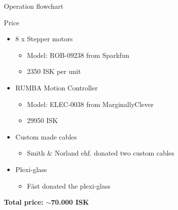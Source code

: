 \documentclass{rubeamer}
\begin{document}
\begin{frame}{Operation flowchart}
	\begin{center}
	\end{center}
\end{frame}

\begin{frame}{Price}
	\begin{itemize}
		\item 8 x Stepper motors
		\begin{itemize}
			\item Model: ROB-09238 from Sparkfun\cite{sf_motor}
			\item 2350 ISK per unit
		\end{itemize}
	\end{itemize}
	\begin{itemize}
		\item RUMBA Motion Controller
		\begin{itemize}
			\item Model: ELEC-0038 from MarginallyClever \cite{sp}
			\item 29950 ISK
		\end{itemize}
	\end{itemize}
	\begin{itemize}
		\item Custom made cables
		\begin{itemize}
			\item Smith \& Norland ehf. donated two custom cables
		\end{itemize}
	\end{itemize}
	\begin{itemize}
		\item Plexi-glass
		\begin{itemize}
			\item Fást donated the plexi-glass
		\end{itemize}
	\end{itemize}
	\bigskip
	\textbf{Total price: $\mathbf{\sim}$70.000 ISK}
\end{frame}
\end{document}
